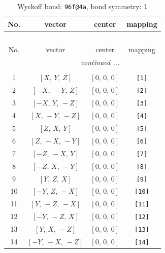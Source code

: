\documentclass[fleqn,8pt]{jsarticle}
\begin{document}
\begin{longtable}{cccc}
\caption{Wyckoff bond: {\tt 96f@4a}, bond symmetry: {\tt 1}}
 \\
 \hline \hline
No. & vector & center & mapping \\ \hline \endfirsthead

\multicolumn{3}{l}{\tablename\ \thetable{}} \\
 \hline \hline
No. & vector & center & mapping \\ \hline \endhead

 \hline \hline
\multicolumn{3}{r}{\footnotesize\it continued ...} \\ \endfoot

 \hline \hline
\multicolumn{3}{r}{} \\ \endlastfoot

1 & $\left[ X,\, Y,\, Z \right]$ & $\left[ 0,\, 0,\, 0 \right]$ & {\tt [1]} \\ \hline
2 & $\left[ - X,\, - Y,\, Z \right]$ & $\left[ 0,\, 0,\, 0 \right]$ & {\tt [2]} \\ \hline
3 & $\left[ - X,\, Y,\, - Z \right]$ & $\left[ 0,\, 0,\, 0 \right]$ & {\tt [3]} \\ \hline
4 & $\left[ X,\, - Y,\, - Z \right]$ & $\left[ 0,\, 0,\, 0 \right]$ & {\tt [4]} \\ \hline
5 & $\left[ Z,\, X,\, Y \right]$ & $\left[ 0,\, 0,\, 0 \right]$ & {\tt [5]} \\ \hline
6 & $\left[ Z,\, - X,\, - Y \right]$ & $\left[ 0,\, 0,\, 0 \right]$ & {\tt [6]} \\ \hline
7 & $\left[ - Z,\, - X,\, Y \right]$ & $\left[ 0,\, 0,\, 0 \right]$ & {\tt [7]} \\ \hline
8 & $\left[ - Z,\, X,\, - Y \right]$ & $\left[ 0,\, 0,\, 0 \right]$ & {\tt [8]} \\ \hline
9 & $\left[ Y,\, Z,\, X \right]$ & $\left[ 0,\, 0,\, 0 \right]$ & {\tt [9]} \\ \hline
10 & $\left[ - Y,\, Z,\, - X \right]$ & $\left[ 0,\, 0,\, 0 \right]$ & {\tt [10]} \\ \hline
11 & $\left[ Y,\, - Z,\, - X \right]$ & $\left[ 0,\, 0,\, 0 \right]$ & {\tt [11]} \\ \hline
12 & $\left[ - Y,\, - Z,\, X \right]$ & $\left[ 0,\, 0,\, 0 \right]$ & {\tt [12]} \\ \hline
13 & $\left[ Y,\, X,\, - Z \right]$ & $\left[ 0,\, 0,\, 0 \right]$ & {\tt [13]} \\ \hline
14 & $\left[ - Y,\, - X,\, - Z \right]$ & $\left[ 0,\, 0,\, 0 \right]$ & {\tt [14]} \\ \hline

\end{longtable}
\end{document}
